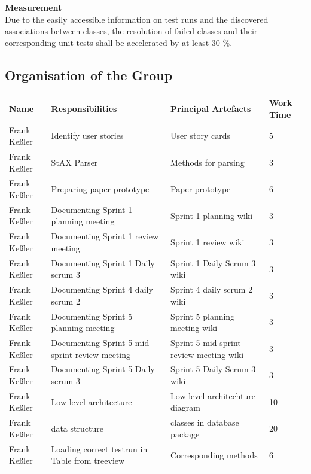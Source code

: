 {\large\textbf{Measurement}}\\ 
Due to the easily accessible information on test runs and the discovered associations between classes, the resolution of failed classes and their corresponding unit tests shall be accelerated by at least 30 \%. 

\newpage
\subsection{Organisation of the Group}
\begin{longtable}{|p{}||p{}|p{}|p{}|}
  \hline
  
  
    Name & Responsibilities & Principal Artefacts & Work Time\\
    \hline
    \hline
    Frank Keßler & Identify user stories & User story cards & 5 \\
    \hline
    Frank Keßler & StAX Parser & Methods for parsing & 3 \\ 
    \hline
    Frank Keßler & Preparing paper prototype & Paper prototype & 6 \\ 
    \hline
    Frank Keßler & Documenting Sprint 1 planning meeting & Sprint 1 planning wiki & 3 \\
    \hline
    Frank Keßler & Documenting Sprint 1 review meeting & Sprint 1 review wiki & 3 \\
	\hline
	Frank Keßler & Documenting Sprint 1 Daily scrum 3 & Sprint 1 Daily Scrum 3 wiki & 3 \\
	\hline
    Frank Keßler & Documenting Sprint 4 daily scrum 2 & Sprint 4 daily scrum 2 wiki & 3 \\
	\hline
	Frank Keßler & Documenting Sprint 5 planning meeting & Sprint 5 planning meeting wiki & 3 \\
	\hline
	Frank Keßler & Documenting Sprint 5 mid-sprint review meeting & Sprint 5 mid-sprint review meeting wiki & 3 \\
	\hline
	Frank Keßler & Documenting Sprint 5 Daily scrum 3 & Sprint 5 Daily Scrum 3 wiki & 3 \\
	\hline
    Frank Keßler & Low level architecture & Low level architechture diagram & 10 \\ 
    \hline
    Frank Keßler & data structure & classes in database package & 20 \\ 
    \hline 
    Frank Keßler & Loading correct testrun in Table from treeview & Corresponding methods & 6 \\ 

\end{longtable}
